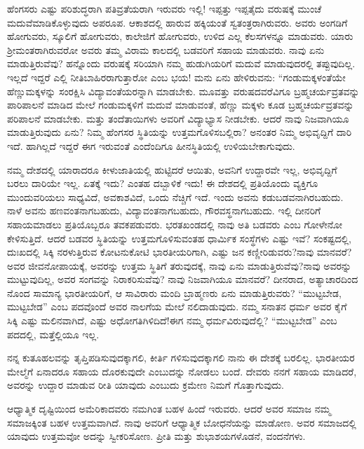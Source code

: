 ಹೆಂಗಸರು ಎಷ್ಟು ಪರಿಶುದ್ಧರಾಗಿ ಪತಿವ್ರತೆಯರಾಗಿ ಇರುವರು ಇಲ್ಲಿ! ಇಪ್ಪತ್ತು ಇಪ್ಪತೈದು ವರುಷಕ್ಕೆ ಮುಂಚೆ ಮದುವೆಮಾಡಿಕೊಳ್ಳುವುದು ಅಪರೂಪ. ಆಕಾಶದಲ್ಲಿ ಹಾರುವ ಹಕ್ಕಿಯಂತೆ ಸ್ವತಂತ್ರರಾಗಿರುವರು. ಅವರು ಅಂಗಡಿಗೆ ಹೋಗುವರು, ಸ್ಕೂಲಿಗೆ ಹೋಗುವರು, ಕಾಲೇಜಿಗೆ ಹೋಗುವರು, ಉಳಿದ ಎಲ್ಲ ಕೆಲಸಗಳನ್ನೂ ಮಾಡುವರು. ಯಾರು ಶ‍್ರೀಮಂತರಾಗಿರುವರೋ ಅವರು ತಮ್ಮ ವಿರಾಮ ಕಾಲದಲ್ಲಿ ಬಡವರಿಗೆ ಸಹಾಯ ಮಾಡುವರು. ನಾವು ಏನು ಮಾಡುತ್ತಿರುವೆವು? ಹನ್ನೊಂದು ವರುಷಕ್ಕೆ ಸರಿಯಾಗಿ ನಮ್ಮ ಹುಡುಗಿಯರಿಗೆ ಮದುವೆ ಮಾಡುವುದರಲ್ಲಿ ತಪ್ಪುವುದಿಲ್ಲ. ಇಲ್ಲದೆ ಇದ್ದರೆ ಎಲ್ಲಿ ನೀತಿಬಾಹಿರರಾಗುತ್ತಾರೋ ಎಂಬ ಭಯ! ಮನು ಏನು ಹೇಳಿರುವನು: “ಗಂಡುಮಕ್ಕಳಂತೆಯೇ ಹೆಣ್ಣುಮಕ್ಕಳನ್ನು ಸಂರಕ್ಷಿಸಿ ವಿದ್ಯಾವಂತೆಯರನ್ನಾಗಿ ಮಾಡಬೇಕು. ಮೂವತ್ತು ವರುಷದವರೆವಿಗೂ ಬ್ರಹ್ಮಚರ್ಯವ್ರತವನ್ನು ಪಾರಿಪಾಲನೆ ಮಾಡಿದ ಮೇಲೆ ಗಂಡುಮಕ್ಕಳಿಗೆ ಮದುವೆ ಮಾಡುವಂತೆ, ಹೆಣ್ಣು ಮಕ್ಕಳು ಕೂಡ ಬ್ರಹ್ಮಚರ್ಯವ್ರತವನ್ನು ಪರಿಪಾಲನೆ ಮಾಡಬೇಕು. ಮತ್ತು ತಂದೆತಾಯಿಗಳು ಅವರಿಗೆ ವಿದ್ಯಾಭ್ಯಾಸ ನೀಡಬೇಕು. ಆದರೆ ನಾವು ನಿಜವಾಗಿಯೂ ಮಾಡುತ್ತಿರುವುದು ಏನು? ನಿಮ್ಮ ಹೆಂಗಸರ ಸ್ಥಿತಿಯನ್ನು ಉತ್ತಮಗೊಳಿಸಬಲ್ಲಿರಾ? ಅನಂತರ ನಿಮ್ಮ ಅಭಿವೃದ್ದಿಗೆ ದಾರಿ ಇದೆ. ಹಾಗಿಲ್ಲದೆ ಇದ್ದರೆ ಈಗ ಇರುವಂತೆ ಎಂದೆಂದಿಗೂ ಹೀನಸ್ಥಿತಿಯಲ್ಲಿ ಉಳಿಯಬೇಕಾಗುವುದು.

ನಮ್ಮ ದೇಶದಲ್ಲಿ ಯಾರಾದರೂ ಕೀಳುಜಾತಿಯಲ್ಲಿ ಹುಟ್ಟಿದರೆ ಆಯಿತು, ಅವನಿಗೆ ಉದ್ದಾರವೇ ಇಲ್ಲ, ಅಭಿವೃದ್ದಿಗೆ ಬರಲು ದಾರಿಯೇ ಇಲ್ಲ. ಏತಕ್ಕೆ ಇದು? ಎಂತಹ ದಬ್ಬಾಳಿಕೆ ಇದು! ಈ ದೇಶದಲ್ಲಿ ಪ್ರತಿಯೊಂದು ವ್ಯಕ್ತಿಗೂ ಮುಂದುವರಿಯಲು ಸಾಧ್ಯವಿದೆ, ಅವಕಾಶವಿದೆ, ಒಂದು ನೆಚ್ಚಿಗೆ ಇದೆ. ಇಂದು ಅವನು ಕಡುಬಡವನಾಗಿರಬಹುದು. ನಾಳೆ ಅವನು ಹಣವಂತನಾಗಬಹುದು, ವಿದ್ಯಾವಂತನಾಗಬಹುದು, ಗೌರವಸ್ಥನಾಗಬಹುದು. ಇಲ್ಲಿ ದೀನರಿಗೆ ಸಹಾಯಮಾಡಲು ಪ್ರತಿಯೊಬ್ಬರೂ ತವಕಪಡುವರು. ಭರತಖಂಡದಲ್ಲಿ ನಾವು ಅತಿ ಬಡವರು ಎಂಬ ಗೋಳೇನೋ ಕೇಳಿಸುತ್ತಿದೆ. ಆದರೆ ಬಡವರ ಸ್ಥಿತಿಯನ್ನು ಉತ್ತಮಗೊಳಿಸುವಂತಹ ಧಾರ್ಮಿಕ ಸಂಸ್ಥೆಗಳು ಎಷ್ಟು ಇವೆ? ಸಂಕಷ್ಟದಲ್ಲಿ, ದುಃಖದಲ್ಲಿ ಸಿಕ್ಕಿ ನರಳುತ್ತಿರುವ ಕೋಟನುಕೋಟಿ ಭಾರತೀಯರಿಗಾಗಿ, ಎಷ್ಟು ಜನ ಕಣ್ಣೀರಿಡುವರು?ನಾವು ಮಾನವರೆ? ಅವರ ಜೀವನೋಪಾಯಕ್ಕೆ, ಅವರನ್ನು ಉತ್ತಮ ಸ್ಥಿತಿಗೆ ತರುವುದಕ್ಕೆ, ನಾವು ಏನು ಮಾಡುತ್ತಿರುವೆವು?ನಾವು ಅವರನ್ನು ಮುಟ್ಟುವುದಿಲ್ಲ, ಅವರ ಸಂಗವನ್ನು ನಿರಾಕರಿಸುವೆವು? ನಾವು ನಿಜವಾಗಿಯೂ ಮಾನವರೆ? ದೀನರಾದ, ಅತ್ಯಾಚಾರದಿಂದ ನೊಂದ ಸಾಮಾನ್ಯ ಭಾರತೀಯರಿಗೆ, ಆ ಸಾವಿರಾರು ಮಂದಿ ಬ್ರಾಹ್ಮಣರು ಏನು ಮಾಡುತ್ತಿರುವರು? “ಮುಟ್ಟಬೇಡ, ಮುಟ್ಟಬೇಡ” ಎಂಬ ಪದವೊಂದೆ ಅವರ ನಾಲಗೆಯ ಮೇಲೆ ನಲಿದಾಡುವುದು. ನಮ್ಮ ಸನಾತನ ಧರ್ಮ ಅವರ ಕೈಗೆ ಸಿಕ್ಕಿ ಎಷ್ಟು ಮಲಿನವಾಗಿದೆ, ಎಷ್ಟು ಅಧೋಗತಿಗಿಳಿದಿದೆ!ಈಗ ನಮ್ಮ ಧರ್ಮವಿರುವುದೆಲ್ಲಿ? “ಮುಟ್ಟಬೇಡ” ಎಂಬ ಪದದಲ್ಲಿ, ಮತ್ತೆಲ್ಲಿಯೂ ಇಲ್ಲ.

ನನ್ನ ಕುತೂಹಲವನ್ನು ತೃಪ್ತಿಪಡಿಸುವುದಕ್ಕಾಗಲಿ, ಕೀರ್ತಿ ಗಳಿಸುವುದಕ್ಕಾಗಲಿ ನಾನು ಈ ದೇಶಕ್ಕೆ ಬರಲಿಲ್ಲ. ಭಾರತೀಯರ ಮೇಲ್ಮೆಗೆ ಏನಾದರೂ ಸಹಾಯ ದೊರಕುವುದೇ ಎಂಬುದನ್ನು ನೋಡಲು ಬಂದೆ. ದೇವರು ನನಗೆ ಸಹಾಯ ಮಾಡಿದರೆ, ಅವರನ್ನು ಉದ್ದಾರ ಮಾಡುವ ರೀತಿ ಯಾವುದು ಎಂಬುದು ಕ್ರಮೇಣ ನಿಮಗೆ ಗೊತ್ತಾಗುವುದು.

ಆಧ್ಯಾತ್ಮಿಕ ದೃಷ್ಟಿಯಿಂದ ಅಮೆರಿಕಾದವರು ನಮಗಿಂತ ಬಹಳ ಹಿಂದೆ ಇರುವರು. ಆದರೆ ಅವರ ಸಮಾಜ ನಮ್ಮ ಸಮಾಜಕ್ಕಿಂತ ಬಹಳ ಉತ್ತಮವಾಗಿದೆ. ನಾವು ಅವರಿಗೆ ಆಧ್ಯಾತ್ಮಿಕ ಬೋಧನೆಯನ್ನು ಮಾಡೋಣ. ಅವರ ಸಮಾಜದಲ್ಲಿ ಯಾವುದು ಉತ್ತಮವೋ ಅದನ್ನು ಸ್ವೀಕರಿಸೋಣ. ಪ್ರೀತಿ ಮತ್ತು ಶುಭಾಶಯಗಳೊಡನೆ, ವಂದನೆಗಳು.

